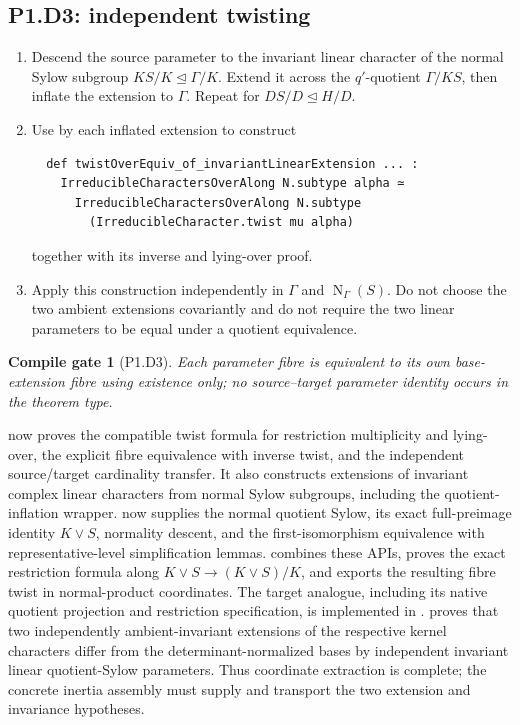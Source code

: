 \documentclass[11pt]{article}
\newtheorem{gate}{Compile gate}
\newcommand{\Norm}{\operatorname{N}}
\begin{document}
\subsection{P1.D3: independent twisting}

\begin{enumerate}[label=\textbf{P1.D3.\arabic*.},leftmargin=*]
  \item Descend the source parameter to the invariant linear character of
  the normal Sylow subgroup \(KS/K\trianglelefteq\Gamma/K\).  Extend it
  across the \(q'\)-quotient \(\Gamma/KS\), then inflate the extension to
  \(\Gamma\).  Repeat for \(DS/D\trianglelefteq H/D\).
  \item Use  by each inflated extension to
  construct
  \begin{lstlisting}
  def twistOverEquiv_of_invariantLinearExtension ... :
    IrreducibleCharactersOverAlong N.subtype alpha ≃
      IrreducibleCharactersOverAlong N.subtype
        (IrreducibleCharacter.twist mu alpha)
  \end{lstlisting}
  together with its inverse and lying-over proof.
  \item Apply this construction independently in \(\Gamma\) and
  \(\Norm_\Gamma(S)\).  Do not choose the two ambient extensions
  covariantly and do not require the two linear parameters to be equal
  under a quotient equivalence.
\end{enumerate}

\begin{gate}[P1.D3]
Each parameter fibre is equivalent to its own base-extension fibre using
existence only; no source--target parameter identity occurs in the theorem
type.
\end{gate}

 now proves the compatible
twist formula for restriction multiplicity and lying-over, the explicit
fibre equivalence with inverse twist, and the independent source/target
cardinality transfer.  It also constructs extensions of invariant complex
linear characters from normal Sylow subgroups, including the
quotient-inflation wrapper.
 now supplies the normal
quotient Sylow, its exact full-preimage identity \(K\vee S\), normality
descent, and the first-isomorphism equivalence with representative-level
simplification lemmas.
 combines these APIs,
proves the exact restriction formula along
\(K\vee S\longrightarrow (K\vee S)/K\), and exports the resulting fibre
twist in normal-product coordinates.  The target analogue, including its
native quotient projection and restriction specification, is implemented
in .
 proves that two
independently ambient-invariant extensions of the respective kernel
characters differ from the determinant-normalized bases by independent
invariant linear quotient-Sylow parameters.  Thus coordinate extraction
is complete; the concrete inertia assembly must supply and transport the
two extension and invariance hypotheses.
\end{document}
